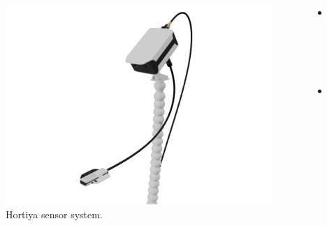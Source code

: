 \begin{frame}
\begin{columns}
\begin{column}{0.6\textwidth}
{\begin{figure}
                    \includegraphics[scale=0.066]{figures/ceres.png}
                    \caption{Hortiya sensor system.}
                \end{figure}
            }
        \end{column}
        \begin{column}{0.4\textwidth}
            \begin{itemize}
                \item test 1 
                \item test 2
            \end{itemize}
        \end{column}
    \end{columns}
\end{frame}

